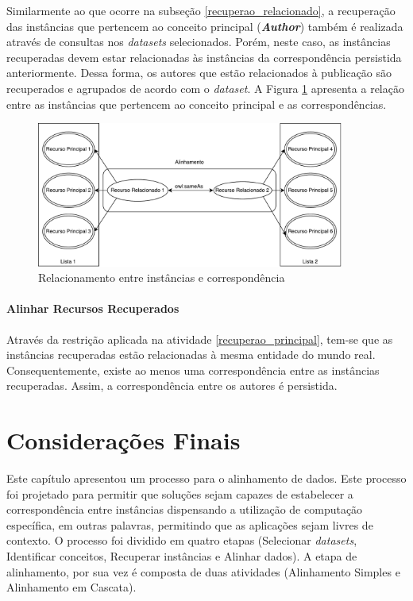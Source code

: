 Similarmente ao que ocorre na subseção \ref{recuperao_relacionado}, a recuperação  das instâncias que pertencem ao conceito principal (\textbf{\textit{Author}}) também é realizada através de consultas nos \textit{datasets} selecionados. Porém, neste caso, as instâncias recuperadas devem estar relacionadas às instâncias da correspondência persistida anteriormente. Dessa forma, os autores que estão relacionados à publicação são recuperados e agrupados de acordo com o \textit{dataset}. A Figura \ref{fig:relacionados} apresenta a relação entre as instâncias que pertencem ao conceito principal e as correspondências.

\begin{figure}[!h]
	\centering
	\includegraphics[width=0.9\textwidth]{./imagens/relacionados.pdf}
	\caption{Relacionamento entre instâncias e correspondência}
	\label{fig:relacionados}
\end{figure}

\paragraph{Alinhar Recursos Recuperados}

Através da restrição aplicada na atividade \ref{recuperao_principal}, tem-se que as instâncias recuperadas estão relacionadas à mesma entidade do mundo real. Consequentemente, existe ao menos uma correspondência entre as instâncias recuperadas. Assim, a correspondência entre os autores é persistida. 
% 
% 
%
%
\section{Considerações Finais}
Este capítulo apresentou um processo para o alinhamento de dados. Este processo foi projetado para permitir que soluções sejam capazes de estabelecer a correspondência entre instâncias dispensando a utilização de computação específica, em outras palavras, permitindo que as aplicações sejam livres de contexto. O processo foi dividido em quatro etapas (Selecionar \textit{datasets}, Identificar conceitos, Recuperar instâncias e Alinhar dados).  A etapa de alinhamento, por sua vez é composta de duas atividades (Alinhamento Simples e Alinhamento em Cascata).

